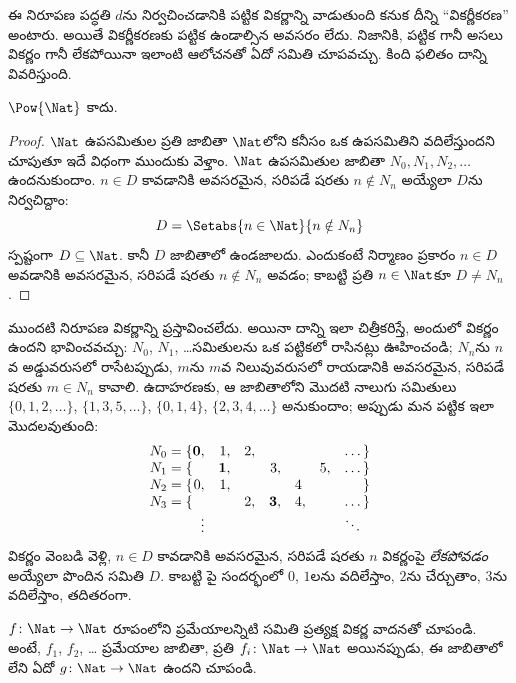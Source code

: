 \documentclass[../../../include/open-logic-section]{subfiles}
\begin{document}
\begin{explain}
ఈ నిరూపణ పద్ధతి $d$ను నిర్వచించడానికి పట్టిక వికర్ణాన్ని వాడుతుంది
కనుక దీన్ని ``వికర్ణీకరణ'' అంటారు. అయితే వికర్ణీకరణకు పట్టిక ఉండాల్సిన
అవసరం లేదు. నిజానికి, పట్టిక గానీ అసలు వికర్ణం గానీ లేకపోయినా ఇలాంటి
ఆలోచనతో ఏదో సమితి  చూపవచ్చు. కింది ఫలితం దాన్ని
వివరిస్తుంది.
\end{explain}

\begin{thm}
$\Pow{\Nat}$  కాదు.
\end{thm}

\begin{proof}
$\Nat$ ఉపసమితుల ప్రతి జాబితా $\Nat$లోని కనీసం ఒక ఉపసమితిని వదిలేస్తుందని
చూపుతూ ఇదే విధంగా ముందుకు వెళ్తాం. $\Nat$ ఉపసమితుల జాబితా
$N_0, N_1, N_2, \ldots$ ఉందనుకుందాం. $n \in D$ కావడానికి అవసరమైన,
సరిపడే షరతు $n \notin N_{n}$ అయ్యేలా $D$ను నిర్వచిద్దాం:
\[
D = \Setabs{n \in \Nat}{n \notin N_n}
\]
స్పష్టంగా $D\subseteq \Nat$. కానీ $D$ జాబితాలో ఉండజాలదు. ఎందుకంటే
నిర్మాణం ప్రకారం $n \in D$ అవడానికి అవసరమైన, సరిపడే షరతు
$n\notin N_n$ అవడం; కాబట్టి ప్రతి $n \in \Nat$కూ $D \neq N_n$.
\end{proof}

\begin{explain}
ముందటి నిరూపణ వికర్ణాన్ని ప్రస్తావించలేదు. అయినా దాన్ని ఇలా చిత్రీకరిస్తే,
అందులో వికర్ణం ఉందని భావించవచ్చు: $N_0$, $N_1$, \dots సమితులను ఒక
పట్టికలో రాసినట్లు ఊహించండి; $N_n$ను $n$వ అడ్డువరుసలో రాసేటప్పుడు,
$m$ను $m$వ నిలువువరుసలో రాయడానికి అవసరమైన, సరిపడే షరతు $m \in N_n$ కావాలి. ఉదాహరణకు,
ఆ జాబితాలోని మొదటి నాలుగు సమితులు $\{0,1,2,\dots\}$,
$\{1, 3, 5, \dots\}$, $\{0,1,4\}$, $\{2,3,4,\dots\}$ అనుకుందాం;
అప్పుడు మన పట్టిక ఇలా మొదలవుతుంది:
\[
\begin{array}{r@{}rrrrrrr}
  N_0 = \{ & \mathbf{0}, & 1, & 2, & & & & \dots\}\\
  N_1 = \{ &  & \mathbf{1}, &  & 3, &  & 5, & \dots\}\\
  N_2 = \{ & 0, & 1, &  &  & 4\phantom{,} &  & \}\\
  N_3 = \{ &  &  & 2, & \mathbf{3}, & 4, & & \dots\}\\
  &\vdots & & & & & & \ddots\phantom{\}}
  \end{array}
\]
వికర్ణం వెంబడి వెళ్లి, $n \in D$ కావడానికి అవసరమైన, సరిపడే షరతు
$n$ వికర్ణంపై \emph{లేకపోవడం} అయ్యేలా పొందిన సమితి $D$. కాబట్టి పై సందర్భంలో $0$, $1$లను
వదిలేస్తాం, $2$ను చేర్చుతాం, $3$ను వదిలేస్తాం, తదితరంగా.
\end{explain}

\begin{prob}
$f \colon \Nat \to \Nat$ రూపంలోని ప్రమేయాలన్నిటి సమితి
 ప్రత్యక్ష వికర్ణ వాదనతో చూపండి. అంటే,
$f_1$, $f_2$, \dots{} ప్రమేయాల జాబితా, ప్రతి $f_i\colon
\Nat \to \Nat$ అయినప్పుడు, ఈ జాబితాలో లేని ఏదో
$g \colon \Nat \to \Nat$ ఉందని చూపండి.
\end{prob}
\end{document}
